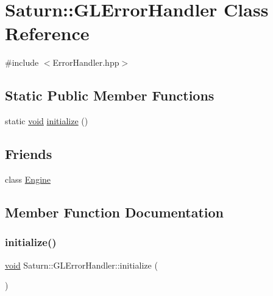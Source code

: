 \hypertarget{class_saturn_1_1_g_l_error_handler}{}\section{Saturn\+:\+:G\+L\+Error\+Handler Class Reference}
\label{class_saturn_1_1_g_l_error_handler}


{\ttfamily \#include $<$Error\+Handler.\+hpp$>$}

\subsection*{Static Public Member Functions}
\begin{DoxyCompactItemize}
\item 
static \mbox{\hyperlink{glad_8h_a950fc91edb4504f62f1c577bf4727c29}{void}} \mbox{\hyperlink{class_saturn_1_1_g_l_error_handler_aab2504d63e0c4d8ec79fb7f47ced451a}{initialize}} ()
\end{DoxyCompactItemize}
\subsection*{Friends}
\begin{DoxyCompactItemize}
\item 
class \mbox{\hyperlink{class_saturn_1_1_g_l_error_handler_a3e1914489e4bed4f9f23cdeab34a43dc}{Engine}}
\end{DoxyCompactItemize}


\subsection{Member Function Documentation}
\mbox{\label{class_saturn_1_1_g_l_error_handler_aab2504d63e0c4d8ec79fb7f47ced451a}} 
\subsubsection{\texorpdfstring{initialize()}{initialize()}}
{\footnotesize\ttfamily \mbox{\hyperlink{glad_8h_a950fc91edb4504f62f1c577bf4727c29}{void}} Saturn\+::\+G\+L\+Error\+Handler\+::initialize (\begin{DoxyParamCaption}{ }\end{DoxyParamCaption})\hspace{0.3cm}{\ttfamily [static]}}

